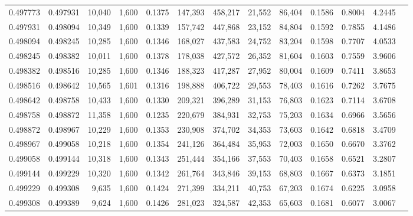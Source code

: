 \begin{tabular}{rrrrrrrrrrrrr}
0.497773 & 0.497931 & 10,040 & 1,600 &                                     0.1375 & 147,393 & 458,217 &  21,552 &  86,404 & 0.1586 & 0.8004 & 4.2445 \\
0.497931 & 0.498094 & 10,349 & 1,600 &                                     0.1339 & 157,742 & 447,868 &  23,152 &  84,804 & 0.1592 & 0.7855 & 4.1486 \\
0.498094 & 0.498245 & 10,285 & 1,600 &                                     0.1346 & 168,027 & 437,583 &  24,752 &  83,204 & 0.1598 & 0.7707 & 4.0533 \\
0.498245 & 0.498382 & 10,011 & 1,600 &                                     0.1378 & 178,038 & 427,572 &  26,352 &  81,604 & 0.1603 & 0.7559 & 3.9606 \\
0.498382 & 0.498516 & 10,285 & 1,600 &                                     0.1346 & 188,323 & 417,287 &  27,952 &  80,004 & 0.1609 & 0.7411 & 3.8653 \\
0.498516 & 0.498642 & 10,565 & 1,601 &                                     0.1316 & 198,888 & 406,722 &  29,553 &  78,403 & 0.1616 & 0.7262 & 3.7675 \\
0.498642 & 0.498758 & 10,433 & 1,600 &                                     0.1330 & 209,321 & 396,289 &  31,153 &  76,803 & 0.1623 & 0.7114 & 3.6708 \\
0.498758 & 0.498872 & 11,358 & 1,600 &                                     0.1235 & 220,679 & 384,931 &  32,753 &  75,203 & 0.1634 & 0.6966 & 3.5656 \\
0.498872 & 0.498967 & 10,229 & 1,600 &                                     0.1353 & 230,908 & 374,702 &  34,353 &  73,603 & 0.1642 & 0.6818 & 3.4709 \\
0.498967 & 0.499058 & 10,218 & 1,600 &                                     0.1354 & 241,126 & 364,484 &  35,953 &  72,003 & 0.1650 & 0.6670 & 3.3762 \\
0.499058 & 0.499144 & 10,318 & 1,600 &                                     0.1343 & 251,444 & 354,166 &  37,553 &  70,403 & 0.1658 & 0.6521 & 3.2807 \\
0.499144 & 0.499229 & 10,320 & 1,600 &                                     0.1342 & 261,764 & 343,846 &  39,153 &  68,803 & 0.1667 & 0.6373 & 3.1851 \\
0.499229 & 0.499308 &  9,635 & 1,600 &                                     0.1424 & 271,399 & 334,211 &  40,753 &  67,203 & 0.1674 & 0.6225 & 3.0958 \\
0.499308 & 0.499389 &  9,624 & 1,600 &                                     0.1426 & 281,023 & 324,587 &  42,353 &  65,603 & 0.1681 & 0.6077 & 3.0067 \\

\end{tabular}
